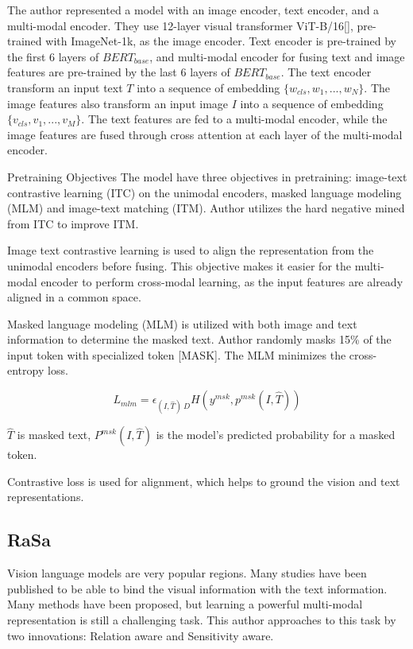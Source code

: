 The author represented a model with an image encoder, text encoder, and a multi-modal encoder. They use 12-layer visual transformer ViT-B/16[\cite{dosovitskiy2021image}], pre-trained with ImageNet-1k, as the image encoder. 
Text encoder is pre-trained by the first 6 layers of $BERT_{base}$, and multi-modal encoder for fusing text and image features are pre-trained by the last 6 layers of $BERT_{base}$. The text encoder transform an input text $T$ into a sequence of embedding $\{w_{cls}, w_1, ..., w_N\}$. The image features also transform an input image $I$ into a sequence of embedding $\{v_{cls}, v_1, ..., v_M\}$. The text features are fed to a multi-modal encoder, while the image features are fused through cross attention at each layer of the multi-modal encoder.

Pretraining Objectives
The model have three objectives in pretraining: image-text contrastive learning (ITC) on the unimodal encoders, masked language modeling (MLM) and image-text matching (ITM).
Author utilizes the hard negative mined from ITC to improve ITM.

Image text contrastive learning is used to align the representation from the unimodal encoders before fusing. This objective makes it easier for the multi-modal encoder to perform cross-modal learning, as the input features are already aligned in a common space. 

Masked language modeling (MLM) is utilized with both image and text information to determine the masked text. Author randomly masks 15\% of the input token with specialized token [MASK]. The MLM minimizes the cross-entropy loss.

\begin{displaymath}
    L_{mlm} = \epsilon_{(I,\hat{T})~D}H(y^{msk}, p^{msk}(I,\hat{T}))
\end{displaymath}

$\hat{T}$ is masked text, $P^{msk}(I,\hat{T})$ is the model's predicted probability for a masked token. 

Contrastive loss is used for alignment, which helps to ground the vision and text representations.

\subsection{RaSa}

Vision language models are very popular regions. Many studies have been published to be able to bind the visual information with the text information. Many methods have been proposed, but learning a powerful multi-modal representation is still a challenging task. This author approaches to this task by two innovations: Relation aware and Sensitivity aware.

